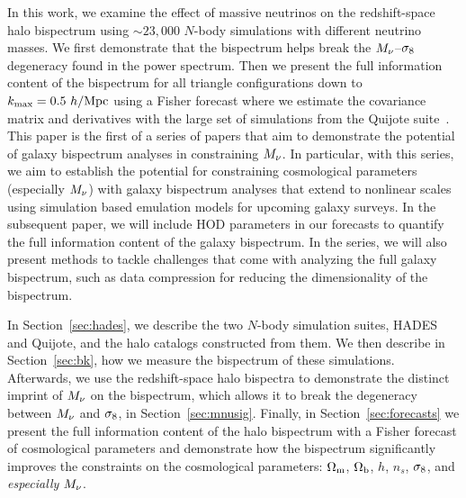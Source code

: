 In this work, we examine the effect of massive neutrinos on the redshift-space 
halo bispectrum using ${\sim}23,000$ $N$-body simulations with different neutrino masses. 
We first demonstrate that the bispectrum helps break the $M_\nu$--$\sigma_8$ degeneracy 
found in the power spectrum. Then we present the full information content of the 
bispectrum for all triangle configurations down to $k_{\rm max} = 0.5~h/{\rm Mpc}$ using 
a Fisher forecast where we estimate the covariance matrix and derivatives with 
the large set of simulations from the Quijote suite~\citep{villaescusa-navarro2019}. 
This paper is the first of a series of papers that aim to demonstrate the potential 
of galaxy bispectrum analyses in constraining $M_\nu$. In particular, with this 
series, we aim to establish the potential for constraining cosmological parameters 
(especially $M_\nu$) with galaxy bispectrum analyses that extend to nonlinear scales 
using simulation based emulation models for upcoming galaxy surveys. In the subsequent 
paper, we will include HOD parameters in our forecasts to quantify the full information 
content of the galaxy bispectrum. In the series, we will also present methods to 
tackle challenges that come with analyzing the full galaxy bispectrum, such as data 
compression for reducing the dimensionality of the bispectrum. 

In Section~\ref{sec:hades}, we describe the two $N$-body simulation suites, HADES and Quijote, 
and the halo catalogs constructed from them. We then describe in Section~\ref{sec:bk}, 
how we measure the bispectrum of these simulations. 
Afterwards, we use the redshift-space halo bispectra to demonstrate the distinct imprint of 
$M_\nu$ on the bispectrum, which allows it to break the degeneracy between 
$M_\nu$ and $\sigma_8$, in Section~\ref{sec:mnusig}. Finally, in Section~\ref{sec:forecasts} 
we present the full information content of the halo bispectrum with a Fisher forecast 
of cosmological parameters and demonstrate how the bispectrum significantly improves 
the constraints on the cosmological parameters: $\Omega_{\rm m}$, $\Omega_{\rm b}$, $h$, $n_s$, $\sigma_8$, and {\em especially} $M_\nu$. 
